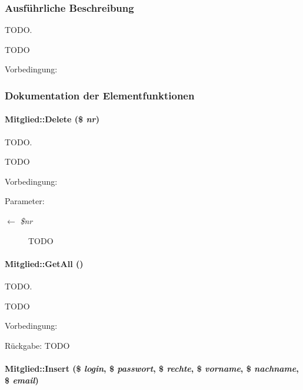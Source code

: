 \subsubsection{Ausf\"{u}hrliche Beschreibung}
TODO. 

TODO \begin{Desc}
\item[Vorbedingung:]\end{Desc}




\subsubsection{Dokumentation der Elementfunktionen}
\hypertarget{classMitglied_c6900c12663e9b228bf9942fc045b8b4}{
\paragraph[Delete]{\setlength{\rightskip}{0pt plus 5cm}Mitglied::Delete (\$ {\em nr})}\hfill}
\label{classMitglied_c6900c12663e9b228bf9942fc045b8b4}


TODO. 

TODO \begin{Desc}
\item[Vorbedingung:]\end{Desc}
\begin{Desc}
\item[Parameter:]
\begin{description}
\item[\mbox{$\leftarrow$} {\em \$nr}]TODO \end{description}
\end{Desc}
\hypertarget{classMitglied_70ce63c9c9a7159966dc9e80a7f726a2}{
\paragraph[GetAll]{\setlength{\rightskip}{0pt plus 5cm}Mitglied::Get\-All ()}\hfill}
\label{classMitglied_70ce63c9c9a7159966dc9e80a7f726a2}


TODO. 

TODO \begin{Desc}
\item[Vorbedingung:]\end{Desc}
\begin{Desc}
\item[R\"{u}ckgabe:]TODO \end{Desc}
\hypertarget{classMitglied_a856527798258505adf9eb08b79fd9fc}{
\paragraph[Insert]{\setlength{\rightskip}{0pt plus 5cm}Mitglied::Insert (\$ {\em login}, \$ {\em passwort}, \$ {\em rechte}, \$ {\em vorname}, \$ {\em nachname}, \$ {\em email})}\hfill}
\label{classMitglied_a856527798258505adf9eb08b79fd9fc}


